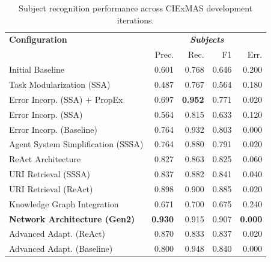 \documentclass[a4paper,oneside,bibliography=totoc]{scrbook}
\begin{document}
\begin{table}[h]
  \centering
  \begin{tabular}{p{6cm}|rrrr}
    \toprule
    \textbf{Configuration}               & \multicolumn{4}{c}{\textit{\textbf{Subjects}}}                                           \\
                                         & Prec.                                          & Rec.           & F1    & Err.           \\
    \midrule
    Initial Baseline                     & 0.601                                          & 0.768          & 0.646 & 0.200          \\
    Task Modularization (SSA)            & 0.487                                          & 0.767          & 0.564 & 0.180          \\
    Error Incorp. (SSA) + PropEx         & 0.697                                          & \textbf{0.952} & 0.771 & 0.020          \\
    Error Incorp. (SSA)                  & 0.564                                          & 0.815          & 0.633 & 0.120          \\
    Error Incorp. (Baseline)             & 0.764                                          & 0.932          & 0.803 & 0.000          \\
    Agent System Simplification (SSSA)   & 0.764                                          & 0.880          & 0.791 & 0.020          \\
    ReAct Architecture                   & 0.827                                          & 0.863          & 0.825 & 0.060          \\
    URI Retrieval (SSSA)                 & 0.837                                          & 0.882          & 0.841 & 0.040          \\
    URI Retrieval (ReAct)                & 0.898                                          & 0.900          & 0.885 & 0.020          \\
    Knowledge Graph Integration          & 0.671                                          & 0.700          & 0.675 & 0.240          \\
    \textbf{Network Architecture (Gen2)} & \textbf{0.930}                                 & 0.915          & 0.907 & \textbf{0.000} \\
    Advanced Adapt. (ReAct)              & 0.870                                          & 0.833          & 0.837 & 0.020          \\
    Advanced Adapt. (Baseline)           & 0.800                                          & 0.948          & 0.840 & 0.000          \\
    \bottomrule
  \end{tabular}
  \caption{Subject recognition performance across CIExMAS development iterations.}
  \label{tab:evaluation_subjects_iterations}
\end{table}
\end{document}
